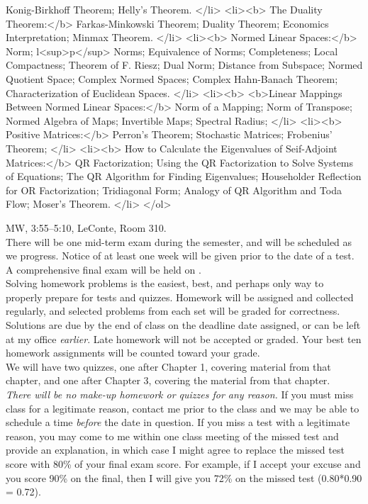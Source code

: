 \documentclass[12pt]{amsart}
\begin{document}
Konig-Birkhoff Theorem;
Helly's Theorem.
</li>
<li><b>
The Duality Theorem:</b>
Farkas-Minkowski Theorem;
Duality Theorem;
Economics Interpretation;
Minmax Theorem.
</li>
<li><b>
Normed Linear Spaces:</b>
Norm;
l<sup>p</sup> Norms;
Equivalence of Norms;
Completeness; 
Local Compactness;
Theorem of F. Riesz;
Dual Norm; 
Distance from Subspace; 
Normed Quotient Space; 
Complex Normed Spaces; 
Complex Hahn-Banach Theorem; 
Characterization of Euclidean Spaces. 
</li>
<li><b>
<b>Linear Mappings Between Normed Linear Spaces:</b>
Norm of a Mapping;
Norm of Transpose;
Normed Algebra of Maps;
Invertible Maps;
Spectral Radius;
</li>
<li><b>
Positive Matrices:</b>
Perron's Theorem;
Stochastic Matrices;
Frobenius' Theorem;
</li>
<li><b>
How to Calculate the Eigenvalues of Seif-Adjoint Matrices:</b>
QR Factorization;
Using the QR Factorization to Solve Systems of Equations;
The QR Algorithm for Finding Eigenvalues; 
Householder Reflection for OR Factorization;
Tridiagonal Form; 
Analogy of QR Algorithm and Toda Flow; 
Moser's Theorem.
</li>
</ol>

 MW, 3:55--5:10, LeConte, Room 310. \\

 There will be one mid-term exam during the semester, and will be scheduled as we progress. Notice of at least one week will be given prior to the date of a
test. A comprehensive final exam will be held on .\\
 
 Solving homework problems is the easiest, best, and perhaps only way
to properly prepare for tests and quizzes.   Homework will be assigned and
collected regularly, and selected problems from each set will be graded for
correctness. Solutions are due by the end of class on the deadline date
assigned, or can be left at my office \emph{earlier}. Late homework will not be
accepted or graded. Your best ten homework assignments will be counted toward
your grade. \\ 

 We will have two quizzes, one after Chapter 1, covering
material from that chapter, and one after Chapter 3, covering the material from
that chapter.  \\

 \emph{There will be no make-up homework or quizzes for any
  reason.} If you must miss class for a legitimate reason, contact me prior to
the class and we may be able to schedule a time \emph{before} the date in
question. If you miss a test with a legitimate reason, you may come to me within
one class meeting of the missed test and provide an explanation, in which case I might
agree to replace the missed test score with 80\% of your final exam score.
For example, if I accept your excuse and you score 90\% on the final, then I
will give you 72\% on the missed test (0.80*0.90 = 0.72).\\
\end{document}

